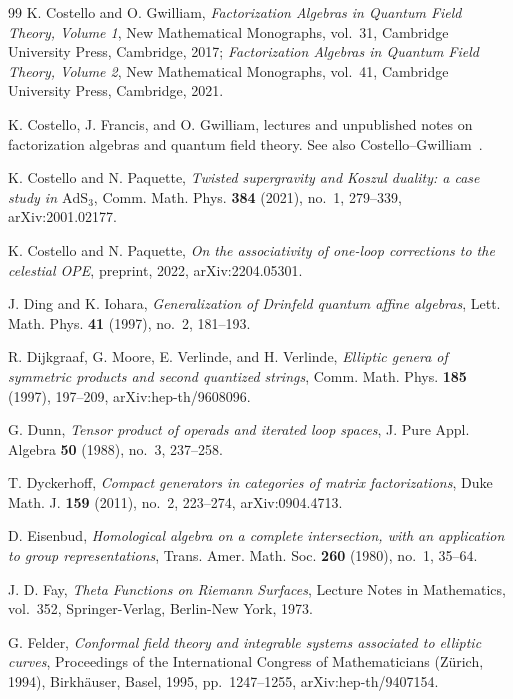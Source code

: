 \begin{thebibliography}{99}
K. Costello and O. Gwilliam, \emph{Factorization Algebras in Quantum Field Theory, Volume 1}, New Mathematical Monographs, vol.~31, Cambridge University Press, Cambridge, 2017; \emph{Factorization Algebras in Quantum Field Theory, Volume 2}, New Mathematical Monographs, vol.~41, Cambridge University Press, Cambridge, 2021.

K. Costello, J. Francis, and O. Gwilliam, lectures and unpublished notes on factorization algebras and quantum field theory. See also Costello--Gwilliam~\cite{CostelloGwilliam}.

K. Costello and N. Paquette, \emph{Twisted supergravity and Koszul duality: a case study in $\mathrm{AdS}_3$}, Comm. Math. Phys. \textbf{384} (2021), no.~1, 279--339, arXiv:2001.02177.

K. Costello and N. Paquette, \emph{On the associativity of one-loop corrections to the celestial OPE}, preprint, 2022, arXiv:2204.05301.

J. Ding and K. Iohara, \emph{Generalization of Drinfeld quantum affine algebras}, Lett. Math. Phys. \textbf{41} (1997), no.~2, 181--193.

R. Dijkgraaf, G. Moore, E. Verlinde, and H. Verlinde, \emph{Elliptic genera of symmetric products and second quantized strings}, Comm. Math. Phys. \textbf{185} (1997), 197--209, arXiv:hep-th/9608096.

G. Dunn, \emph{Tensor product of operads and iterated loop spaces}, J. Pure Appl. Algebra \textbf{50} (1988), no.~3, 237--258.

T. Dyckerhoff, \emph{Compact generators in categories of matrix factorizations}, Duke Math. J. \textbf{159} (2011), no.~2, 223--274, arXiv:0904.4713.

D. Eisenbud, \emph{Homological algebra on a complete intersection, with an application to group representations}, Trans. Amer. Math. Soc. \textbf{260} (1980), no.~1, 35--64.

J. D. Fay, \emph{Theta Functions on Riemann Surfaces}, Lecture Notes in Mathematics, vol.~352, Springer-Verlag, Berlin-New York, 1973.

G. Felder, \emph{Conformal field theory and integrable systems associated to elliptic curves}, Proceedings of the International Congress of Mathematicians (Z\"urich, 1994), Birkh\"auser, Basel, 1995, pp.~1247--1255, arXiv:hep-th/9407154.


\end{thebibliography}
